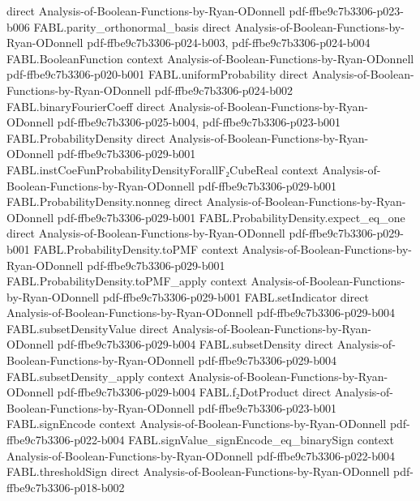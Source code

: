 \begin{theorem}
  {direct}
  {Analysis-of-Boolean-Functions-by-Ryan-ODonnell}
  {pdf-ffbe9c7b3306-p023-b006}
\proofstep
  {FABL.parity_orthonormal_basis}
  {direct}
  {Analysis-of-Boolean-Functions-by-Ryan-ODonnell}
  {pdf-ffbe9c7b3306-p024-b003,
    pdf-ffbe9c7b3306-p024-b004}
\proofstep
  {FABL.BooleanFunction}
  {context}
  {Analysis-of-Boolean-Functions-by-Ryan-ODonnell}
  {pdf-ffbe9c7b3306-p020-b001}
\proofstep
  {FABL.uniformProbability}
  {direct}
  {Analysis-of-Boolean-Functions-by-Ryan-ODonnell}
  {pdf-ffbe9c7b3306-p024-b002}
\proofstep
  {FABL.binaryFourierCoeff}
  {direct}
  {Analysis-of-Boolean-Functions-by-Ryan-ODonnell}
  {pdf-ffbe9c7b3306-p025-b004,
    pdf-ffbe9c7b3306-p023-b001}
\proofstep
  {FABL.ProbabilityDensity}
  {direct}
  {Analysis-of-Boolean-Functions-by-Ryan-ODonnell}
  {pdf-ffbe9c7b3306-p029-b001}
\proofstep
  {FABL.instCoeFunProbabilityDensityForallF₂CubeReal}
  {context}
  {Analysis-of-Boolean-Functions-by-Ryan-ODonnell}
  {pdf-ffbe9c7b3306-p029-b001}
\proofstep
  {FABL.ProbabilityDensity.nonneg}
  {direct}
  {Analysis-of-Boolean-Functions-by-Ryan-ODonnell}
  {pdf-ffbe9c7b3306-p029-b001}
\proofstep
  {FABL.ProbabilityDensity.expect_eq_one}
  {direct}
  {Analysis-of-Boolean-Functions-by-Ryan-ODonnell}
  {pdf-ffbe9c7b3306-p029-b001}
\proofstep
  {FABL.ProbabilityDensity.toPMF}
  {context}
  {Analysis-of-Boolean-Functions-by-Ryan-ODonnell}
  {pdf-ffbe9c7b3306-p029-b001}
\proofstep
  {FABL.ProbabilityDensity.toPMF_apply}
  {context}
  {Analysis-of-Boolean-Functions-by-Ryan-ODonnell}
  {pdf-ffbe9c7b3306-p029-b001}
\proofstep
  {FABL.setIndicator}
  {direct}
  {Analysis-of-Boolean-Functions-by-Ryan-ODonnell}
  {pdf-ffbe9c7b3306-p029-b004}
\proofstep
  {FABL.subsetDensityValue}
  {direct}
  {Analysis-of-Boolean-Functions-by-Ryan-ODonnell}
  {pdf-ffbe9c7b3306-p029-b004}
\proofstep
  {FABL.subsetDensity}
  {direct}
  {Analysis-of-Boolean-Functions-by-Ryan-ODonnell}
  {pdf-ffbe9c7b3306-p029-b004}
\proofstep
  {FABL.subsetDensity_apply}
  {context}
  {Analysis-of-Boolean-Functions-by-Ryan-ODonnell}
  {pdf-ffbe9c7b3306-p029-b004}
\proofstep
  {FABL.f₂DotProduct}
  {direct}
  {Analysis-of-Boolean-Functions-by-Ryan-ODonnell}
  {pdf-ffbe9c7b3306-p023-b001}
\proofstep
  {FABL.signEncode}
  {context}
  {Analysis-of-Boolean-Functions-by-Ryan-ODonnell}
  {pdf-ffbe9c7b3306-p022-b004}
\proofstep
  {FABL.signValue_signEncode_eq_binarySign}
  {context}
  {Analysis-of-Boolean-Functions-by-Ryan-ODonnell}
  {pdf-ffbe9c7b3306-p022-b004}
\proofstep
  {FABL.thresholdSign}
  {direct}
  {Analysis-of-Boolean-Functions-by-Ryan-ODonnell}
  {pdf-ffbe9c7b3306-p018-b002}
\proofstep

\end{theorem}
